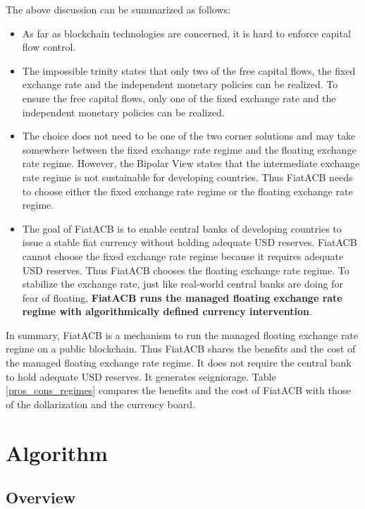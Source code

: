 \documentclass[dvipdfmx,a4paper]{article}
\begin{document}
The above discussion can be summarized as follows:

\begin{itemize}
\item As far as blockchain technologies are concerned, it is hard to enforce capital flow control.
\item The impossible trinity states that only two of the free capital flows, the fixed exchange rate and the independent monetary policies can be realized. To ensure the free capital flows, only one of the fixed exchange rate and the independent monetary policies can be realized.
\item The choice does not need to be one of the two corner solutions and may take somewhere between the fixed exchange rate regime and the floating exchange rate regime. However, the Bipolar View states that the intermediate exchange rate regime is not sustainable for developing countries. Thus FiatACB needs to choose either the fixed exchange rate regime or the floating exchange rate regime.
\item The goal of FiatACB is to enable central banks of developing countries to issue a stable fiat currency without holding adequate USD reserves. FiatACB cannot choose the fixed exchange rate regime because it requires adequate USD reserves. Thus FiatACB chooses the floating exchange rate regime. To stabilize the exchange rate, just like real-world central banks are doing for fear of floating, \textbf{FiatACB runs the managed floating exchange rate regime with algorithmically defined currency intervention}.
\end{itemize}

In summary, FiatACB is a mechanism to run the managed floating exchange rate regime on a public blockchain. Thus FiatACB shares the benefits and the cost of the managed floating exchange rate regime. It does not require the central bank to hold adequate USD reserves. It generates seigniorage. Table \ref{pros_cons_regimes} compares the benefits and the cost of FiatACB with those of the dollarization and the currency board.

\section{Algorithm}

\subsection{Overview}
\end{document}
